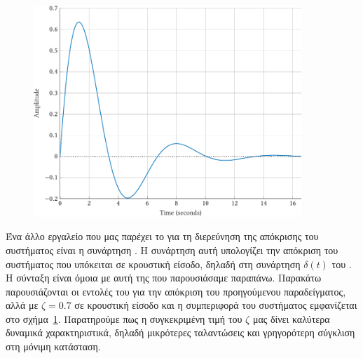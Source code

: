 \begin{figure}[h!]
    \centering
    \includegraphics[width=0.9\textwidth]{figures/prelim6.pdf}
    \label{fig:prelim6}
\end{figure}
Ένα άλλο εργαλείο που μας παρέχει το  για τη διερεύνηση της απόκρισης
του συστήματος είναι η συνάρτηση . Η συνάρτηση αυτή υπολογίζει την
απόκριση του συστήματος που υπόκειται σε κρουστική είσοδο, δηλαδή στη συνάρτηση
\( \delta(t) \) του . Η σύνταξη είναι όμοια με αυτή της 
που παρουσιάσαμε παραπάνω. Παρακάτω παρουσιάζονται οι εντολές του 
για την απόκριση του προηγούμενου παραδείγματος, αλλά με \( \zeta = 0.7 \)
σε κρουστική είσοδο και η συμπεριφορά του συστήματος εμφανίζεται στο
σχήμα~\ref{fig:prelim6}. Παρατηρούμε πως η συγκεκριμένη τιμή του \( \zeta \) μας
δίνει καλύτερα δυναμικά χαρακτηριστικά, δηλαδή μικρότερες ταλαντώσεις και
γρηγορότερη σύγκλιση στη μόνιμη κατάσταση.
\eng{}

